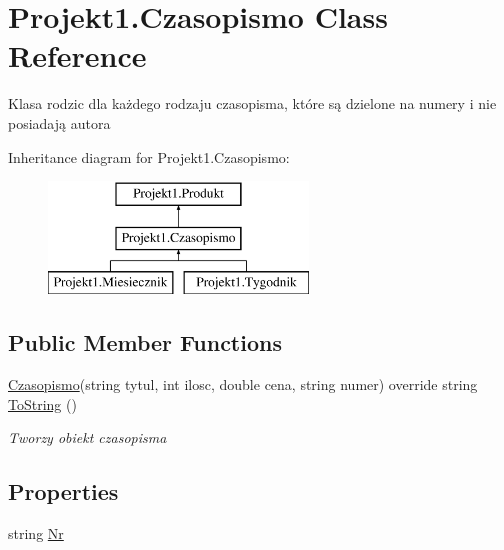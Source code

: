 \hypertarget{class_projekt1_1_1_czasopismo}{}\section{Projekt1.\+Czasopismo Class Reference}
\label{class_projekt1_1_1_czasopismo}


Klasa \textquotesingle{}rodzic\textquotesingle{} dla każdego rodzaju czasopisma, które są dzielone na numery i nie posiadają autora  


Inheritance diagram for Projekt1.\+Czasopismo\+:\begin{figure}[H]
\begin{center}
\leavevmode
\includegraphics[height=3.000000cm]{class_projekt1_1_1_czasopismo}
\end{center}
\end{figure}
\subsection*{Public Member Functions}
\begin{DoxyCompactItemize}
\item 
\mbox{\hyperlink{class_projekt1_1_1_czasopismo}{Czasopismo}}(string tytul, int ilosc, double cena, string numer) override string \mbox{\hyperlink{class_projekt1_1_1_czasopismo_a00c3303e5c13094a5296ac740c00ced9}{To\+String}} ()
\begin{DoxyCompactList}\small\item\em Tworzy obiekt czasopisma \end{DoxyCompactList}\end{DoxyCompactItemize}
\subsection*{Properties}
\begin{DoxyCompactItemize}
\item 
string \mbox{\hyperlink{class_projekt1_1_1_czasopismo_a8a359ecfcbcaad862e93b9bcaaa10e42}{Nr}}
\end{DoxyCompactItemize}



